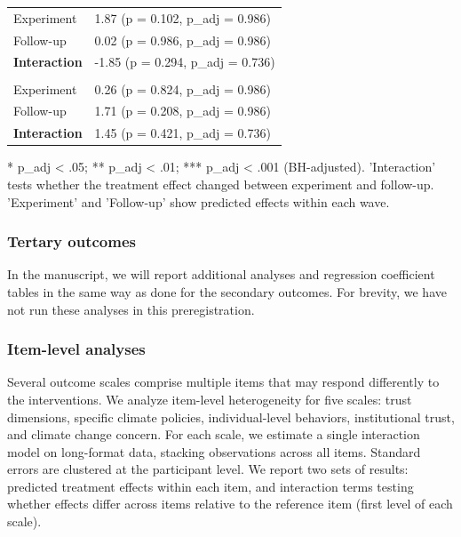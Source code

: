\documentclass[
  letterpaper,
  DIV=11,
  numbers=noendperiod]{scrartcl}
\begin{document}
\begin{longtable}{l|l}
\midrule\addlinespace[2.5pt]
Experiment & {1.87 (p = 0.102, p\_adj = 0.986)} \\ 
Follow-up & {0.02 (p = 0.986, p\_adj = 0.986)} \\ 
{\bfseries Interaction} & {-1.85 (p = 0.294, p\_adj = 0.736)} \\ 
\midrule\addlinespace[2.5pt]
\multicolumn{2}{l}{{\bfseries intervention\_6}} \\[2.5pt] 
\midrule\addlinespace[2.5pt]
Experiment & {0.26 (p = 0.824, p\_adj = 0.986)} \\ 
Follow-up & {1.71 (p = 0.208, p\_adj = 0.986)} \\ 
{\bfseries Interaction} & {1.45 (p = 0.421, p\_adj = 0.736)} \\ 
\bottomrule

\end{longtable}

\begin{minipage}{\linewidth}
* p\_adj < .05; ** p\_adj < .01; *** p\_adj < .001 (BH-adjusted). 'Interaction' tests whether the treatment effect changed between experiment and follow-up. 'Experiment' and 'Follow-up' show predicted effects within each wave.\\
\end{minipage}
\endgroup

\subsubsection{Tertary outcomes}\label{tertary-outcomes}

In the manuscript, we will report additional analyses and regression
coefficient tables in the same way as done for the secondary outcomes.
For brevity, we have not run these analyses in this preregistration.

\subsubsection{Item-level analyses}\label{item-level-analyses-1}

Several outcome scales comprise multiple items that may respond
differently to the interventions. We analyze item-level heterogeneity
for five scales: trust dimensions, specific climate policies,
individual-level behaviors, institutional trust, and climate change
concern. For each scale, we estimate a single interaction model on
long-format data, stacking observations across all items. Standard
errors are clustered at the participant level. We report two sets of
results: predicted treatment effects within each item, and interaction
terms testing whether effects differ across items relative to the
reference item (first level of each scale).
\end{document}
